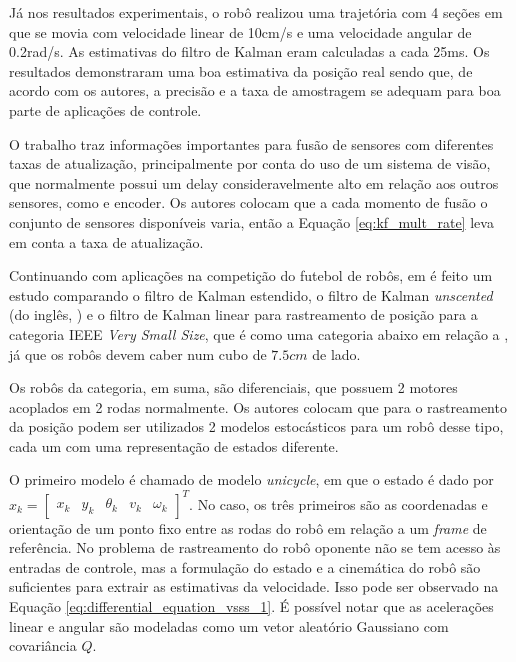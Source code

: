 \documentclass[acronym, symbols, table]{fei}
\begin{document}
Já nos resultados experimentais, o robô realizou uma trajetória com 4 seções em que se movia com velocidade linear de 10cm/s e uma velocidade angular de 0.2rad/s. As estimativas do filtro de Kalman eram calculadas a cada 25ms. Os resultados demonstraram uma boa estimativa da posição real sendo que, de acordo com os autores, a precisão e a taxa de amostragem se adequam para boa parte de aplicações de controle.

O trabalho traz informações importantes para fusão de sensores com diferentes taxas de atualização, principalmente por conta do uso de um sistema de visão, que normalmente possui um delay consideravelmente alto em relação aos outros sensores, como  e encoder. Os autores colocam que a cada momento de fusão o conjunto de sensores disponíveis varia, então a Equação \ref{eq:kf_mult_rate} leva em conta a taxa de atualização.

Continuando com aplicações na competição do futebol de robôs, em \textcite{aguiar2017kalman} é feito um estudo comparando o filtro de Kalman estendido, o filtro de Kalman \textit{unscented} (do inglês, ) e o filtro de Kalman linear para rastreamento de posição para a categoria IEEE \textit{Very Small Size}, que é como uma categoria abaixo em relação a , já que os robôs devem caber num cubo de $7.5cm$ de lado.

Os robôs da categoria, em suma, são diferenciais, que possuem 2 motores acoplados em 2 rodas normalmente. Os autores colocam que para o rastreamento da posição podem ser utilizados 2 modelos estocásticos para um robô desse tipo, cada um com uma representação de estados diferente. 

O primeiro modelo é chamado de modelo \textit{unicycle}, em que o estado é dado por $x_k = \begin{bmatrix}
	x_k & y_k & \theta_k & v_k & \omega_k \end{bmatrix}^T$. No caso, os três primeiros são as coordenadas e orientação de um ponto fixo entre as rodas do robô em relação a um \textit{frame} de referência. No problema de rastreamento do robô oponente não se tem acesso às entradas de controle, mas a formulação do estado e a cinemática do robô são suficientes para extrair as estimativas da velocidade. Isso pode ser observado na Equação \ref{eq:differential_equation_vsss_1}. É possível notar que as acelerações linear e angular são modeladas como um vetor aleatório Gaussiano com covariância $Q$.
\end{document}
